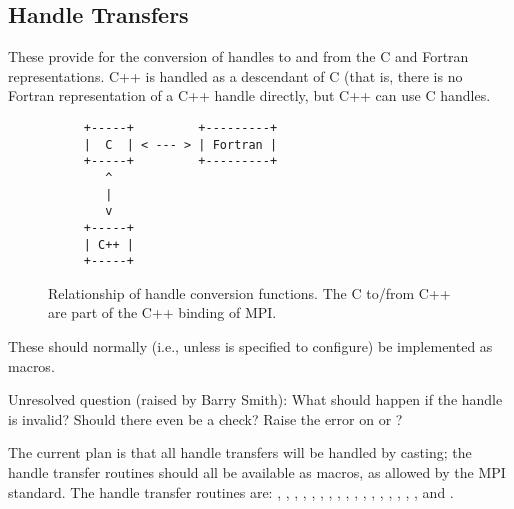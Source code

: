 \documentclass{article}
\begin{document}
\subsection{Handle Transfers}
These provide for the conversion of handles to and from the C and
Fortran representations.  C++ is handled as a descendant of C (that
is, there is no Fortran representation of a C++ handle directly, but
C++ can use C handles.  
\begin{figure}
\begin{verbatim}
     +-----+         +---------+
     |  C  | < --- > | Fortran |
     +-----+         +---------+
        ^
        |
        v
     +-----+ 
     | C++ | 
     +-----+ 
\end{verbatim}
\caption{Relationship of handle conversion functions.  The C to/from
C++ are part of the C++ binding of MPI.}\label{fig:handle-transfers}
\end{figure}
These should normally (i.e., unless
 is
specified to configure) be implemented as macros.  

Unresolved question (raised by Barry Smith):  What should happen if
the handle is invalid?  Should there even be a check?  Raise the error
on  or ?

The current plan is that all handle transfers will be handled by casting;
the handle transfer routines should all be available as macros, as allowed by
the MPI standard.  The handle transfer routines are:
,
,
,
,
,
,
,
,
,
,
,
,
,
,
,
,
, and
.
\end{document}

